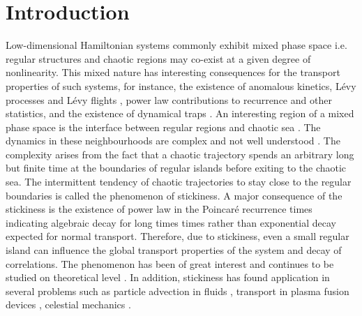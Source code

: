 \documentclass[reprint,superscriptaddress,amsmath,amssymb,aps,pre]{revtex4-1}
\begin{document}
\section{Introduction} 
Low-dimensional Hamiltonian systems commonly exhibit mixed phase space i.e. regular structures and chaotic regions may co-exist at a given degree of nonlinearity. This mixed nature has interesting consequences for the transport properties of such systems, for instance, the existence of anomalous kinetics, L\'{e}vy processes and L\'{e}vy flights \cite{Klafter1994,Zaburdaev2015}, power law contributions to recurrence and other statistics, and the existence of dynamical traps \cite{Zaslavsky2002a,Zaslavsky2002b}. An interesting region of a mixed phase space is the interface between regular regions and chaotic sea \cite{Mackay1984, Easton1993}. The dynamics in these neighbourhoods are complex and not well understood \cite{Meiss2015}. The complexity arises from the fact that a chaotic trajectory spends an arbitrary long but finite time at the boundaries of regular islands before exiting to the chaotic sea. The intermittent tendency of chaotic trajectories to stay close to the regular boundaries is called the phenomenon of stickiness. A major consequence of the stickiness is  the existence of power law in the Poincar{\'e} recurrence times indicating algebraic decay for long times times rather than exponential decay expected for normal transport. Therefore, due to stickiness, even a small regular island can influence the global transport properties of the system and decay of correlations. The phenomenon has been of great interest and continues to be studied on theoretical level \cite{Altmann2006, Altmann2010,Livorati2012,Bunimovich2012, Kruger2015}. In addition, stickiness has found application in several problems such as particle advection in fluids \cite{Babiano1994,Tel2005}, transport in plasma fusion devices \cite{Szezech2012,Martins2014}, celestial mechanics \cite{Efthymiopoulos1999, Harsoula2010, Harsoula2016}.
\end{document}
